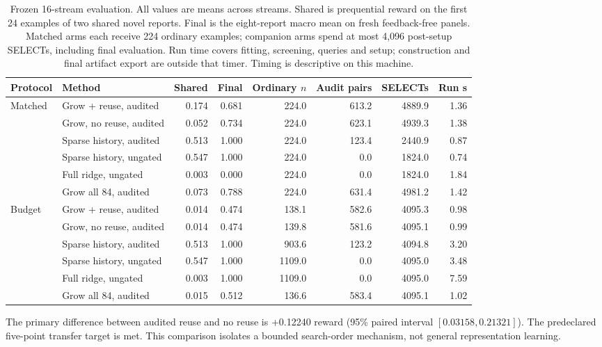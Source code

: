 \begin{table}[t]
\centering\small
\caption{Frozen 16-stream evaluation. All values are means across streams. Shared is prequential reward on the first 24 examples of two shared novel reports. Final is the eight-report macro mean on fresh feedback-free panels. Matched arms each receive 224 ordinary examples; companion arms spend at most 4,096 post-setup SELECTs, including final evaluation. Run time covers fitting, screening, queries and setup; construction and final artifact export are outside that timer. Timing is descriptive on this machine.}
\label{tab:v7results}
\begin{tabular}{llrrrrrr}
\toprule
Protocol & Method & Shared & Final & Ordinary $n$ & Audit pairs & SELECTs & Run s \\
\midrule
Matched & Grow + reuse, audited & 0.174 & 0.681 & 224.0 & 613.2 & 4889.9 & 1.36 \\
 & Grow, no reuse, audited & 0.052 & 0.734 & 224.0 & 623.1 & 4939.3 & 1.38 \\
 & Sparse history, audited & 0.513 & 1.000 & 224.0 & 123.4 & 2440.9 & 0.87 \\
 & Sparse history, ungated & 0.547 & 1.000 & 224.0 & 0.0 & 1824.0 & 0.74 \\
 & Full ridge, ungated & 0.003 & 0.000 & 224.0 & 0.0 & 1824.0 & 1.84 \\
 & Grow all 84, audited & 0.073 & 0.788 & 224.0 & 631.4 & 4981.2 & 1.42 \\
\midrule
Budget & Grow + reuse, audited & 0.014 & 0.474 & 138.1 & 582.6 & 4095.3 & 0.98 \\
 & Grow, no reuse, audited & 0.014 & 0.474 & 139.8 & 581.6 & 4095.1 & 0.99 \\
 & Sparse history, audited & 0.513 & 1.000 & 903.6 & 123.2 & 4094.8 & 3.20 \\
 & Sparse history, ungated & 0.547 & 1.000 & 1109.0 & 0.0 & 4095.0 & 3.48 \\
 & Full ridge, ungated & 0.003 & 1.000 & 1109.0 & 0.0 & 4095.0 & 7.59 \\
 & Grow all 84, audited & 0.015 & 0.512 & 136.6 & 583.4 & 4095.1 & 1.02 \\
\bottomrule
\end{tabular}
\end{table}

The primary difference between audited reuse and no reuse is +0.12240 reward (95\% paired interval $[0.03158,0.21321]$). The predeclared five-point transfer target is met. This comparison isolates a bounded search-order mechanism, not general representation learning.

